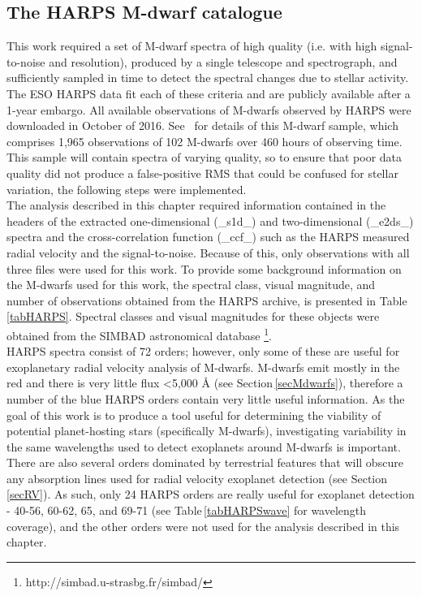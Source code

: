 \subsection{The HARPS M-dwarf catalogue}
\label{secHARPS}
This work required a set of M-dwarf spectra of high quality (i.e. with high signal-to-noise and resolution), produced by a single telescope and spectrograph, and sufficiently sampled in time to detect the spectral changes due to stellar activity. The ESO HARPS data fit each of these criteria and are publicly available after a 1-year embargo. All available observations of M-dwarfs observed by HARPS were downloaded in October of 2016. See \,\citet{2013Bonfils} for details of this M-dwarf sample, which comprises 1,965 observations of 102 M-dwarfs over 460 hours of observing time. This sample will contain spectra of varying quality, so to ensure that poor data quality did not produce a false-positive RMS that could be confused for stellar variation, the following steps were implemented.\\

The analysis described in this chapter required information contained in the headers of the extracted one-dimensional (\_s1d\_) and two-dimensional (\_e2ds\_) spectra and the cross-correlation function (\_ccf\_) such as the HARPS measured radial velocity and the signal-to-noise. Because of this, only observations with all three files were used for this work. To provide some background information on the M-dwarfs used for this work, the spectral class, visual magnitude, and number of observations obtained from the HARPS archive, is presented in Table\,\ref{tabHARPS}. Spectral classes and visual magnitudes for these objects were obtained from the SIMBAD astronomical database \footnote{http://simbad.u-strasbg.fr/simbad/}.\\

HARPS spectra consist of 72 orders; however, only some of these are useful for exoplanetary radial velocity analysis of M-dwarfs. M-dwarfs emit mostly in the red and there is very little flux \textless5,000 \hbox{\AA} (see Section\,\ref{secMdwarfs}), therefore a number of the blue HARPS orders contain very little useful information. As the goal of this work is to produce a tool useful for determining the viability of potential planet-hosting stars (specifically M-dwarfs), investigating variability in the same wavelengths used to detect exoplanets around M-dwarfs is important. There are also several orders dominated by terrestrial features that will obscure any absorption lines used for radial velocity exoplanet detection (see Section\,\ref{secRV}). As such, only 24 HARPS orders are really useful for exoplanet detection - 40-56, 60-62, 65, and 69-71 (see Table\,\ref{tabHARPSwave} for wavelength coverage), and the other orders were not used for the analysis described in this chapter.\\

